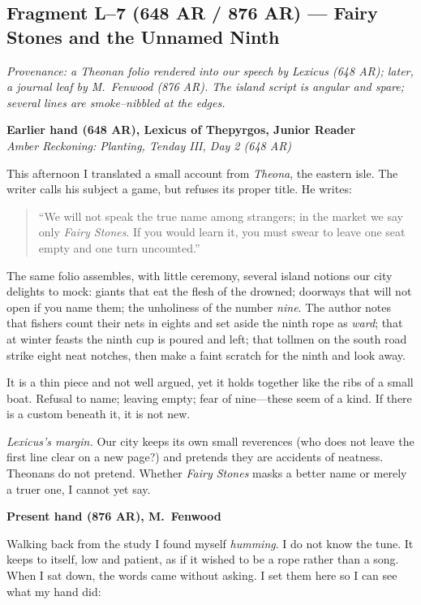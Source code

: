 \documentclass[11pt]{article}
\numberwithin{equation}{section} %
\theoremstyle{plain} %
\theoremstyle{definition} %
\theoremstyle{remark} %
\begin{document}
\subsection{Fragment L--7 (648 AR / 876 AR) — Fairy Stones and the Unnamed Ninth}
\label{frag:l7}

\noindent\textit{Provenance: a Theonan folio rendered into our speech by Lexicus (648 AR); later, a journal leaf by M.\ Fenwood (876 AR). The island script is angular and spare; several lines are smoke–nibbled at the edges.}

\medskip
\noindent\textbf{Earlier hand (648 AR), Lexicus of Thepyrgos, Junior Reader}\\
\noindent\textit{Amber Reckoning: Planting, Tenday III, Day 2 (648 AR)}

This afternoon I translated a small account from \textit{Theona}, the eastern isle. The writer calls his subject a game, but refuses its proper title. He writes:

\begin{quote}\small
“We will not speak the true name among strangers; in the market we say only \emph{Fairy Stones}. If you would learn it, you must swear to leave one seat empty and one turn uncounted.”
\end{quote}

The same folio assembles, with little ceremony, several island notions our city delights to mock: giants that eat the flesh of the drowned; doorways that will not open if you name them; the unholiness of the number \textit{nine}. The author notes that fishers count their nets in eights and set aside the ninth rope as \emph{ward}; that at winter feasts the ninth cup is poured and left; that tollmen on the south road strike eight neat notches, then make a faint scratch for the ninth and look away.

It is a thin piece and not well argued, yet it holds together like the ribs of a small boat. Refusal to name; leaving empty; fear of nine—these seem of a kind. If there is a custom beneath it, it is not new.

\medskip
\noindent\textit{Lexicus’s margin.} Our city keeps its own small reverences (who does not leave the first line clear on a new page?) and pretends they are accidents of neatness. Theonans do not pretend. Whether \emph{Fairy Stones} masks a better name or merely a truer one, I cannot yet say.

\medskip
\noindent\textbf{Present hand (876 AR), M.\ Fenwood}

Walking back from the study I found myself \emph{humming}. I do not know the tune. It keeps to itself, low and patient, as if it wished to be a rope rather than a song. When I sat down, the words came without asking. I set them here so I can see what my hand did:
\end{document}
